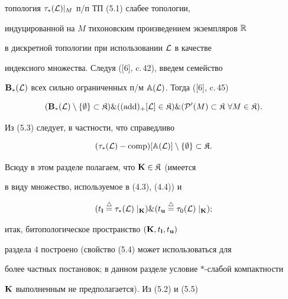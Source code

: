 топология ${{\tau}_*}({\cal L})|_M$ п/п ТП (5.1) слабее топологии,


индуцированной на $M$ тихоновским произведением экземпляров ${\Bbb R}$


в дискретной топологии при использовании ${\cal L}$ в качестве


индексного множества. Следуя ([6], c.\,42), введем семейство


${{\bold B}_*}({\cal L})$ всех сильно ограниченных п/м ${\Bbb A}({\cal


L})$. Тогда ([6], c.\,45)


\begin{equation}


({{\bold B}_*}({\cal L}) \setminus \{\emp\} \subset {\frak K}) \&


({(\add)_+}[{\cal L}] \in {\frak K}) \& (


{{\cal P}'}(M) \subset {\frak K}\ \fo{M} \in {\frak K}).


\end{equation}


Из (5.3) следует, в частности, что справедливо


\begin{equation}


({{\tau}_*}({\cal L}) - {\comp})[{\Bbb A}({\cal L})] \setminus


\{\emp\} \subset {\frak K}.


\end{equation}





Всюду в этом разделе полагаем, что ${\bold K} \in {\frak K}$ (имеется


в виду множество, используемое в (4.3), (4.4)) и


\begin{equation}


({t_{\bold l}} \stac {{\tau}_*}({\cal L})\mid_{\bold K}) \&


({t_{\bold u}} \stac {{\tau}_0}({\cal L})\mid_{\bold K});


\end{equation}


итак, битопологическое пространство $({\bold K},{t_{\bold l}},{t_{\bold u}})$


раздела 4 построено (свойство (5.4) может использоваться для


более частных постановок; в данном разделе условие $*$-слабой компактности


${\bold K}$ выполненным не предполагается). Из (5.2) и (5.5)


